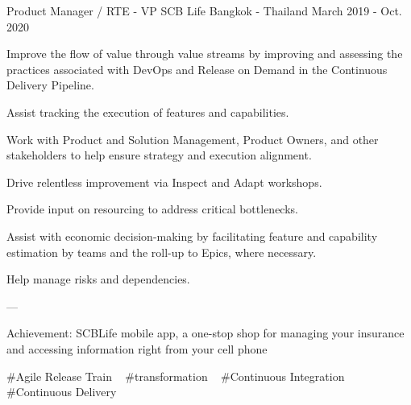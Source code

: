\begin{cventries}
  \cventry
    {Product Manager / RTE - VP} %
    {SCB Life} %
    {Bangkok - Thailand} %
    {March 2019 - Oct. 2020} %
    {
      \begin{cvitems} %
        \item {Improve the flow of value through value streams by improving and assessing the practices associated with DevOps and Release on Demand in the Continuous Delivery Pipeline.}
        \item {Assist tracking the execution of features and capabilities.}
        \item {Work with Product and Solution Management, Product Owners, and other stakeholders to help ensure strategy and execution alignment.}
        \item {Drive relentless improvement via Inspect and Adapt workshops.}
        \item {Provide input on resourcing to address critical bottlenecks.}
        \item {Assist with economic decision-making by facilitating feature and capability estimation by teams and the roll-up to Epics, where necessary.}
        \item {Help manage risks and dependencies.}
        \item {---}
        \item {Achievement: SCBLife mobile app, a one-stop shop for managing your insurance and accessing information right from your cell phone}
      \end{cvitems}
    }
    {
      \#Agile Release Train ~
      \#transformation ~
      \#Continuous Integration ~
      \#Continuous Delivery ~
    }


\end{cventries}
